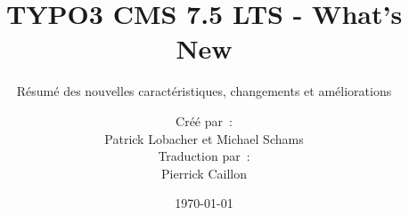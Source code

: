 %

%
%

\documentclass[t]{beamer}

\beamertemplatenavigationsymbolsempty

{
	\usetheme{typo3slides}
}

\title{TYPO3 CMS 7.5 LTS - What's New}
\subtitle{Résumé des nouvelles caractéristiques, changements et améliorations}
\author{
	\centerline{Créé par~:}
	\centerline{Patrick Lobacher et Michael Schams}
	\vspace{0.2cm}
	\centerline{Traduction par~:}
	Pierrick Caillon
}

\date{\today}



\sharefont


\begingroup
	[default]
	\begin{frame}
		\titlepage
	\end{frame}
\endgroup


\section*{TYPO3 CMS 7.5 - What's New}
\begin{frame}[fragile]
	\frametitle{Sommaire}
	\framesubtitle{Sommaire}

	\tableofcontents

\end{frame}

